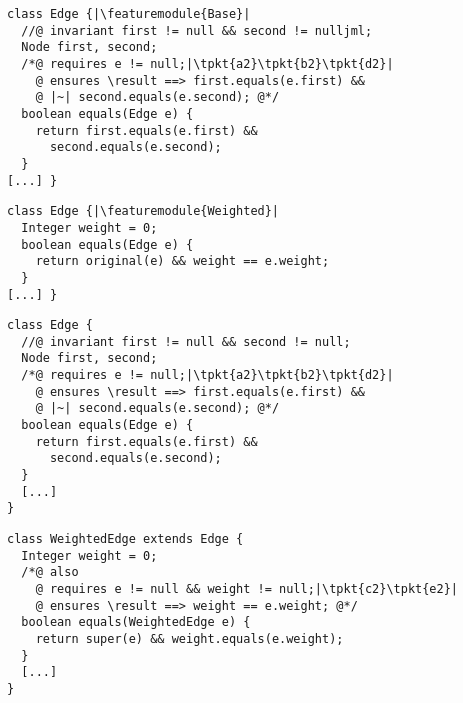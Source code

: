 
\newsavebox{\pcbase}
\begin{lrbox}{\pcbase}
	\begin{minipage}{72mm}
\begin{lstlisting}
class Edge {|\featuremodule{Base}|
  //@ invariant first != null && second != nulljml;
  Node first, second;
  /*@ requires e != null;|\tpkt{a2}\tpkt{b2}\tpkt{d2}|
    @ ensures \result ==> first.equals(e.first) &&
    @ |~| second.equals(e.second); @*/
  boolean equals(Edge e) {
    return first.equals(e.first) &&
      second.equals(e.second);
  }
[...] }
\end{lstlisting}
	\end{minipage}
\end{lrbox}

\newsavebox{\pcweight}
\begin{lrbox}{\pcweight}
	\begin{minipage}{72mm}
\begin{lstlisting}
class Edge {|\featuremodule{Weighted}|
  Integer weight = 0;
  boolean equals(Edge e) {
    return original(e) && weight == e.weight;
  }
[...] }
\end{lstlisting}
	\end{minipage}
\end{lrbox}


\newsavebox{\bhsuper}
\begin{lrbox}{\bhsuper}
	\begin{minipage}{55mm}
\begin{lstlisting}
class Edge {
  //@ invariant first != null && second != null;
  Node first, second;
  /*@ requires e != null;|\tpkt{a2}\tpkt{b2}\tpkt{d2}|
    @ ensures \result ==> first.equals(e.first) &&
    @ |~| second.equals(e.second); @*/
  boolean equals(Edge e) {
    return first.equals(e.first) &&
      second.equals(e.second);
  }
  [...]
}
\end{lstlisting}
	\end{minipage}
\end{lrbox}

\newsavebox{\bhsub}
\begin{lrbox}{\bhsub}
	\begin{minipage}{55mm}
\begin{lstlisting}
class WeightedEdge extends Edge {
  Integer weight = 0;
  /*@ also
    @ requires e != null && weight != null;|\tpkt{c2}\tpkt{e2}|
    @ ensures \result ==> weight == e.weight; @*/
  boolean equals(WeightedEdge e) {
    return super(e) && weight.equals(e.weight);
  }
  [...]
}
\end{lstlisting}
	\end{minipage}
\end{lrbox}

